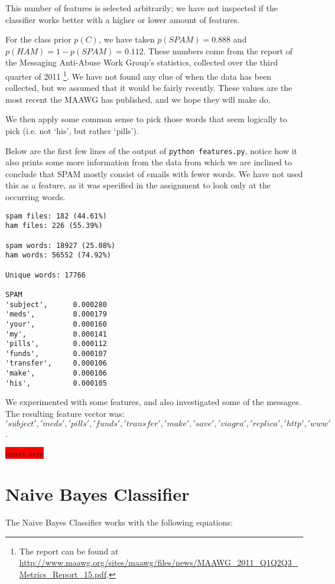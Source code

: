 \documentclass[a4paper,11pt]{article}
\newcommand{\todo}[1]{\colorbox{red}{\color{white}#1}}
\begin{document}
This number of features is selected arbitrarily; we have not inspected if the classifier works better with a higher or lower amount of features.

For the class prior $p(C)$, we have taken $p(SPAM) = 0.888$ and $p(HAM) = 1 - p(SPAM) = 0.112$.  These numbers come from the report of the Messaging Anti-Abuse Work Group's statistics, collected over the third quarter of 2011 \footnote{The report can be found at \url{http://www.maawg.org/sites/maawg/files/news/MAAWG_2011_Q1Q2Q3_Metrics_Report_15.pdf}.}.  We have not found any clue of when the data has been collected, but we assumed that it would be fairly recently.  These values are the most recent the MAAWG has published, and we hope they will make do.

We then apply some common sense to pick those words that seem logically to 
pick (i.e. not `his', but rather `pills').  

Below are the first few lines of the output of \texttt{python features.py}, 
notice how it also prints some more information from the data from which we 
are inclined to conclude that SPAM mostly consist of emails with fewer words.  We have not used this as a feature, as it was specified in the assignment to look only at the occurring words.
\begin{center}
\begin{verbatim}
spam files: 182 (44.61%)
ham files: 226 (55.39%)

spam words: 18927 (25.08%)
ham words: 56552 (74.92%)

Unique words: 17766

SPAM
'subject',      0.000280
'meds',         0.000179
'your',         0.000160
'my',           0.000141
'pills',        0.000112
'funds',        0.000107
'transfer',     0.000106
'make',         0.000106
'his',          0.000105
\end{verbatim}
\end{center}

We experimented with some features, and also investigated some of the 
messages. The resulting feature vector was: 
\['subject', 'meds', 'pills', 'funds', 'transfer', 'make', 'save', 'viagra', 'replica', 'http', 'www'\].

\todo{insert here}

\section{Naive Bayes Classifier}
The Naive Bayes Classifier works with the following equations: 
\end{document}
